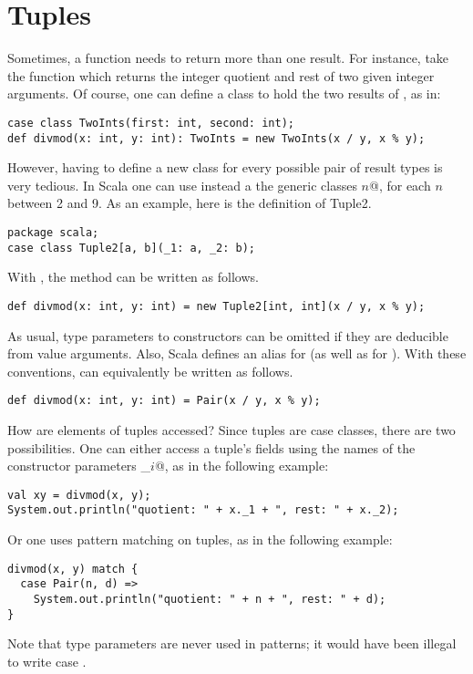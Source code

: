 \section{Tuples}

Sometimes, a function needs to return more than one result. For
instance, take the function  which returns the integer quotient
and rest of two given integer arguments.  Of course, one can define a
class to hold the two results of , as in:
\begin{lstlisting}
case class TwoInts(first: int, second: int);
def divmod(x: int, y: int): TwoInts = new TwoInts(x / y, x % y);
\end{lstlisting}
However, having to define a new class for every possible pair of
result types is very tedious. In Scala one can use instead a
the generic classes \lstinline@Tuple$n$@, for each $n$ between
2 and 9.  As an example, here is the definition of Tuple2.
\begin{lstlisting}
package scala;
case class Tuple2[a, b](_1: a, _2: b);
\end{lstlisting}
With , the  method can be written as follows.
\begin{lstlisting}
def divmod(x: int, y: int) = new Tuple2[int, int](x / y, x % y);
\end{lstlisting}
As usual, type parameters to constructors can be omitted if they are
deducible from value arguments. Also, Scala defines an alias
 for  (as well as  for ).
With these conventions,  can equivalently be written as
follows.
\begin{lstlisting}
def divmod(x: int, y: int) = Pair(x / y, x % y);
\end{lstlisting}
How are elements of tuples accessed? Since tuples are case classes,
there are two possibilities. One can either access a tuple's fields
using the names of the constructor parameters \lstinline@_$i$@, as in the following example:
\begin{lstlisting}
val xy = divmod(x, y);
System.out.println("quotient: " + x._1 + ", rest: " + x._2);
\end{lstlisting}
Or one uses pattern matching on tuples, as in the following example:
\begin{lstlisting}
divmod(x, y) match {
  case Pair(n, d) => 
    System.out.println("quotient: " + n + ", rest: " + d);
}
\end{lstlisting}
Note that type parameters are never used in patterns; it would have
been illegal to write case .


